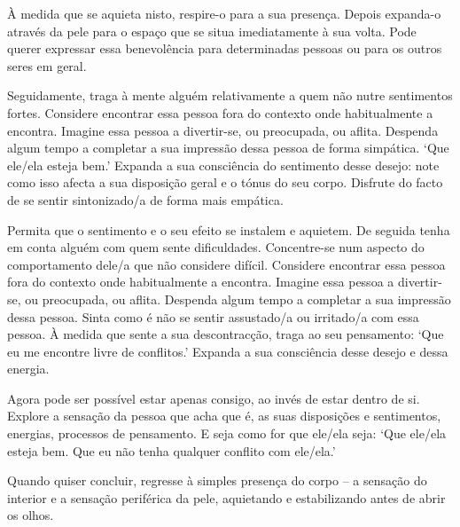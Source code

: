 À medida que se aquieta nisto, respire-o para a sua presença. Depois expanda-o
através da pele para o espaço que se situa imediatamente à sua volta. Pode
querer expressar essa benevolência para determinadas pessoas ou para os outros
seres em geral.

Seguidamente, traga à mente alguém relativamente a quem não nutre sentimentos
fortes. Considere encontrar essa pessoa fora do contexto onde habitualmente a
encontra. Imagine essa pessoa a divertir-se, ou preocupada, ou aflita. Despenda
algum tempo a completar a sua impressão dessa pessoa de forma simpática. `Que
ele/ela esteja bem.' Expanda a sua consciência do sentimento desse desejo: note
como isso afecta a sua disposição geral e o tónus do seu corpo. Disfrute do
facto de se sentir sintonizado/a de forma mais empática.

Permita que o sentimento e o seu efeito se instalem e aquietem. De seguida tenha
em conta alguém com quem sente dificuldades. Concentre-se num aspecto do
comportamento dele/a que não considere difícil. Considere encontrar essa pessoa
fora do contexto onde habitualmente a encontra. Imagine essa pessoa a
divertir-se, ou preocupada, ou aflita. Despenda algum tempo a completar a sua
impressão dessa pessoa. Sinta como é não se sentir assustado/a ou irritado/a com
essa pessoa. À medida que sente a sua descontracção, traga ao seu pensamento:
`Que eu me encontre livre de conflitos.' Expanda a sua consciência desse desejo
e dessa energia.

Agora pode ser possível estar apenas consigo, ao invés de estar dentro de si.
Explore a sensação da pessoa que acha que é, as suas disposições e sentimentos,
energias, processos de pensamento. E seja como for que ele/ela seja: `Que
ele/ela esteja bem. Que eu não tenha qualquer conflito com ele/ela.'

Quando quiser concluir, regresse à simples presença do corpo -- a sensação do
interior e a sensação periférica da pele, aquietando e estabilizando antes de
abrir os olhos.
